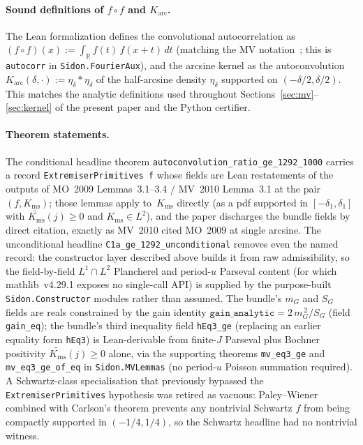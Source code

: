 \documentclass[11pt, letterpaper]{article}
\theoremstyle{paperplain}
\theoremstyle{paperdef}
\newcommand{\R}{\mathbb{R}}
\newcommand{\Karc}{K_{\mathrm{arc}}}
\newcommand{\Kms}{K_{\mathrm{ms}}}
\begin{document}
\paragraph{Sound definitions of \texorpdfstring{$f\circ f$}{f circ f}
and \texorpdfstring{$\Karc$}{K\_arc}.}
The Lean formalization defines the convolutional autocorrelation as
$(f\circ f)(x):=\int_{\R}f(t)\,f(x+t)\,dt$ (matching the MV
notation~\cite[\S 3]{MV10}; this is \texttt{autocorr} in
\texttt{Sidon.FourierAux}), and the arcsine kernel as the
autoconvolution $\Karc(\delta,\cdot):=\eta_\delta*\eta_\delta$ of the
half-arcsine density $\eta_\delta$ supported on
$(-\delta/2,\delta/2)$.  This matches the analytic definitions used
throughout Sections~\ref{sec:mv}--\ref{sec:kernel} of the present
paper and the Python certifier.

\paragraph{Theorem statements.}
The conditional headline theorem
\texttt{autoconvolution\_ratio\_ge\_1292\_1000} carries a record
\texttt{ExtremiserPrimitives f} whose fields are Lean restatements of
the outputs of MO~2009 Lemmas~3.1--3.4 / MV~2010 Lemma~3.1 at the
pair $(f,\Kms)$; those lemmas apply to~$\Kms$ directly (as a pdf
supported in $[-\delta_1,\delta_1]$ with $\widetilde{\Kms}(j)\ge 0$
and $\Kms\in L^2$), and the paper discharges the bundle fields by
direct citation, exactly as MV~2010 cited MO~2009 at single arcsine.
The unconditional headline \texttt{C1a\_ge\_1292\_unconditional}
removes even the named record: the constructor layer described above
builds it from raw admissibility, so the field-by-field
$L^1\cap L^2$ Plancherel and period-$u$ Parseval content (for which
mathlib~v4.29.1 exposes no single-call API) is supplied by the
purpose-built \texttt{Sidon.Constructor} modules rather than assumed.
The bundle's $m_G$ and $S_G$ fields are reals constrained
by the gain identity $\texttt{gain\_analytic}=2\,m_G^{\,2}/S_G$
(field \texttt{gain\_eq}); the bundle's third inequality field
\texttt{hEq3\_ge} (replacing an earlier equality form \texttt{hEq3})
is Lean-derivable from finite-$J$ Parseval plus Bochner
positivity $\widetilde{\Kms}(j)\ge 0$ alone, via the supporting
theorems \texttt{mv\_eq3\_ge} and \texttt{mv\_eq3\_ge\_of\_eq} in
\texttt{Sidon.MVLemmas} (no period-$u$ Poisson summation required).
A Schwartz-class specialisation that previously bypassed the
\texttt{ExtremiserPrimitives} hypothesis was retired as vacuous:
Paley--Wiener combined with Carlson's theorem prevents any
nontrivial Schwartz $f$ from being compactly supported in
$(-1/4,1/4)$, so the Schwartz headline had no nontrivial witness.
\end{document}
